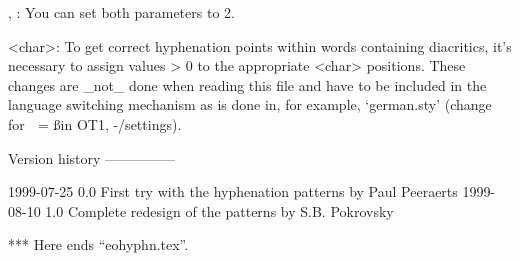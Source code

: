\lefthyphenmin, \righthyphenmin:
  You can set both parameters to 2.

\lccode <char>:
  To get correct hyphenation points within words containing
  diacritics, it's necessary to assign values > 0 to the
  appropriate \lccode <char> positions.
  These changes are _not_ done when reading this file and have to
  be included in the language switching mechanism as is done in,
  for example, `german.sty' (\lccode change for ^^Y = \ss in OT1,
  \left-/\righthyphenmin settings).

Version history
---------------

1999-07-25  0.0  First try with the hyphenation patterns by Paul Peeraerts
1999-08-10  1.0  Complete redesign of the patterns by S.B. Pokrovsky

*** Here ends ``eohyphn.tex''.
